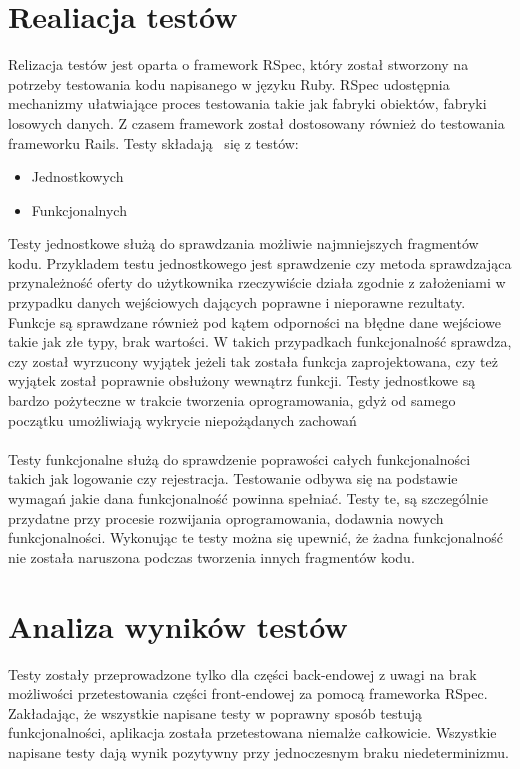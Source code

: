 \section{Realiacja testów}
Relizacja testów jest oparta o framework RSpec, który został stworzony na potrzeby testowania kodu napisanego w języku Ruby. RSpec udostępnia mechanizmy ułatwiające proces testowania takie jak fabryki obiektów, fabryki losowych danych. Z czasem framework został dostosowany również do testowania frameworku Rails. Testy składają  się z testów:
\begin{itemize}
\item Jednostkowych
\item Funkcjonalnych
\end{itemize}
Testy jednostkowe służą do sprawdzania możliwie najmniejszych fragmentów kodu. Przykladem testu jednostkowego jest sprawdzenie czy metoda sprawdzająca przynależność oferty do użytkownika rzeczywiście działa zgodnie z założeniami w przypadku danych wejściowych dających poprawne i nieporawne rezultaty. Funkcje są sprawdzane również pod kątem odporności na błędne dane wejściowe takie jak złe typy, brak wartości. W takich przypadkach funkcjonalność sprawdza, czy został wyrzucony wyjątek jeżeli tak została funkcja zaprojektowana, czy też wyjątek został poprawnie obsłużony wewnątrz funkcji. Testy jednostkowe są bardzo pożyteczne w trakcie tworzenia oprogramowania, gdyż od samego początku umożliwiają wykrycie niepożądanych zachowań\\
\\
Testy funkcjonalne służą do sprawdzenie poprawości całych funkcjonalności takich jak logowanie czy rejestracja. Testowanie odbywa się na podstawie wymagań jakie dana funkcjonalność powinna spełniać. Testy te, są szczególnie przydatne przy procesie rozwijania oprogramowania, dodawnia nowych funkcjonalności. Wykonując te testy można się upewnić, że żadna funkcjonalność nie została naruszona podczas tworzenia innych fragmentów kodu.

\section{Analiza wyników testów}
Testy zostały przeprowadzone tylko dla części back-endowej z uwagi na brak możliwości przetestowania części front-endowej za pomocą frameworka RSpec. Zakładając, że wszystkie napisane testy w poprawny sposób testują funkcjonalności, aplikacja została przetestowana niemalże całkowicie. Wszystkie napisane testy dają wynik pozytywny przy jednoczesnym braku niedeterminizmu.
